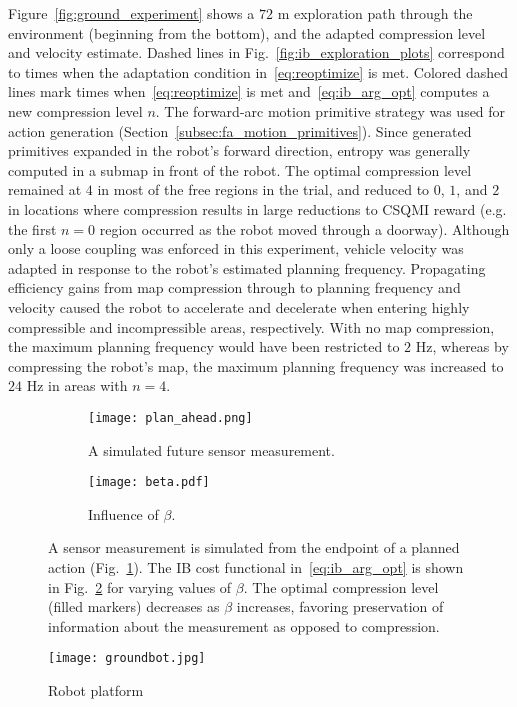 Figure~\ref{fig:ground_experiment} shows a $72$ m
exploration path through the environment (beginning from the bottom), and the
adapted compression level and velocity estimate. Dashed lines in
Fig.~\ref{fig:ib_exploration_plots} correspond to times when the adaptation condition
in~\eqref{eq:reoptimize} is met. Colored dashed lines mark times
when~\eqref{eq:reoptimize} is met and~\eqref{eq:ib_arg_opt} computes a new
compression level $n$. The forward-arc motion primitive strategy was used for
action generation (Section~\ref{subsec:fa_motion_primitives}). Since generated primitives
expanded in the robot's forward direction, entropy was generally computed in a submap in front of
the robot. The optimal compression level remained at $4$ in most of the free regions
in the trial, and reduced to $0$, $1$, and $2$ in locations where compression results
in large reductions to CSQMI reward (e.g. the first $n=0$ region occurred as the robot
moved through a doorway). Although only a loose coupling was enforced in this experiment,
vehicle velocity was adapted in response to the robot's estimated planning frequency.
Propagating efficiency gains from map compression through to planning frequency
and velocity caused the robot to accelerate and decelerate when entering highly
compressible and incompressible areas, respectively. With no map compression,
the maximum planning frequency would have been restricted to $2$ Hz, whereas
by compressing the robot's map, the maximum
planning frequency was increased to $24$ Hz in areas with
$n=4$.

\begin{figure}
    \centering
    \begin{subfigure}[t]{0.5\textwidth}
        \centering
        \texttt{[image: plan\_ahead.png]}
        \caption{A simulated future sensor measurement.\label{fig:loss_compression1}}
    \end{subfigure}
    \hfill
    \begin{subfigure}[t]{0.44\textwidth}
        \centering
        \texttt{[image: beta.pdf]}
        \caption{Influence of $\beta$.\label{fig:loss_compression2}}
    \end{subfigure}
    \caption[Information Bottleneck optimization for varying values of $\beta$]{
      A sensor measurement is simulated from the endpoint of a planned action
      (Fig.~\ref{fig:loss_compression1}). The IB cost functional
      in~\eqref{eq:ib_arg_opt} is shown in Fig.~\ref{fig:loss_compression2} for
      varying values of $\beta$. The optimal compression level (filled markers)
     decreases as $\beta$ increases, favoring preservation of information about the
   measurement as opposed to compression. \label{fig:loss_compression}}
\end{figure}
%
\begin{figure}
  \centering
  \texttt{[image: groundbot.jpg]}
  \caption[Experimental robot platform.]{Robot platform\label{fig:robot_platform}}
\end{figure}

